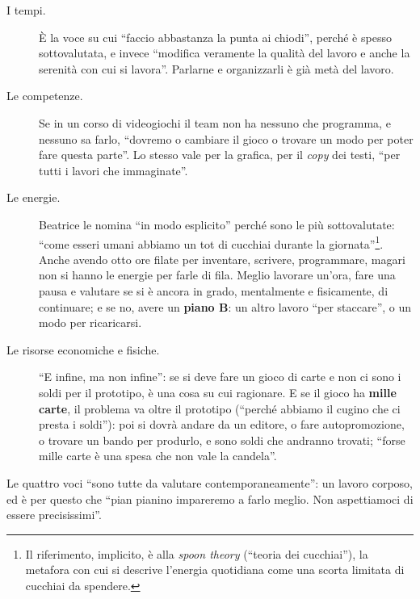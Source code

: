\begin{description}
  \item[I tempi.] È la voce su cui ``faccio abbastanza la punta ai chiodi'', perché è
        spesso sottovalutata, e invece ``modifica veramente la qualità del lavoro e
        anche la serenità con cui si lavora''. Parlarne e organizzarli è già metà del
        lavoro.
  \item[Le competenze.] Se in un corso di videogiochi il team non ha nessuno che
        programma, e nessuno sa farlo, ``dovremo o cambiare il gioco o trovare un modo
        per poter fare questa parte''. Lo stesso vale per la grafica, per il
        \emph{copy} dei testi, ``per tutti i lavori che immaginate''.
  \item[Le energie.] Beatrice le nomina ``in modo esplicito'' perché sono le più
        sottovalutate: ``come esseri umani abbiamo un tot di cucchiai durante la
        giornata''\footnote{Il riferimento, implicito, è alla \emph{spoon theory}
        (``teoria dei cucchiai''), la metafora con cui si descrive l'energia
        quotidiana come una scorta limitata di cucchiai da spendere.}. Anche avendo
        otto ore filate per inventare, scrivere, programmare, magari non si hanno le
        energie per farle di fila. Meglio lavorare un'ora, fare una pausa e valutare
        se si è ancora in grado, mentalmente e fisicamente, di continuare; e se no,
        avere un \textbf{piano B}: un altro lavoro ``per staccare'', o un modo per
        ricaricarsi.
  \item[Le risorse economiche e fisiche.] ``E infine, ma non infine'': se si deve
        fare un gioco di carte e non ci sono i soldi per il prototipo, è una cosa su
        cui ragionare. E se il gioco ha \textbf{mille carte}, il problema va oltre
        il prototipo (``perché abbiamo il cugino che ci presta i soldi''): poi si
        dovrà andare da un editore, o fare autopromozione, o trovare un bando per
        produrlo, e sono soldi che andranno trovati; ``forse mille carte è una spesa
        che non vale la candela''.
\end{description}
Le quattro voci ``sono tutte da valutare contemporaneamente'': un lavoro corposo, ed
è per questo che ``pian pianino impareremo a farlo meglio. Non aspettiamoci di essere
precisissimi''.

